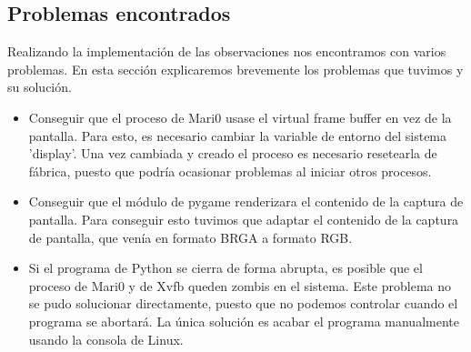 \subsection*{Problemas encontrados}

Realizando la implementación de las observaciones nos encontramos con varios problemas. En esta sección explicaremos brevemente los problemas que tuvimos y su solución.

\begin{itemize}
    \item Conseguir que el proceso de Mari0 usase el virtual frame buffer en vez de la pantalla. Para esto, es necesario cambiar la variable de entorno del sistema 'display'. Una vez cambiada y creado el proceso es necesario resetearla de fábrica, puesto que podría ocasionar problemas al iniciar otros procesos.
    \item Conseguir que el módulo de pygame renderizara el contenido de la captura de pantalla. Para conseguir esto tuvimos que adaptar el contenido de la captura de pantalla, que venía en formato BRGA a formato RGB.
    \item Si el programa de Python se cierra de forma abrupta, es posible que el proceso de Mari0 y de Xvfb queden zombis en el sistema. Este problema no se pudo solucionar directamente, puesto que no podemos controlar cuando el programa se abortará. La única solución es acabar el programa manualmente usando la consola de Linux.
\end{itemize}



